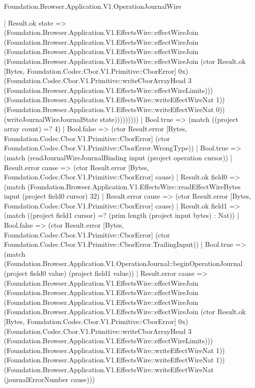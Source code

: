 \begin{lexlean}{Foundation.Browser.Application.V1.OperationJournalWire}
\begin{semanticmodule}
{                          | Result.ok state => (Foundation.Browser.Application.V1.EffectsWire::effectWireJoin (Foundation.Browser.Application.V1.EffectsWire::effectWireJoin (Foundation.Browser.Application.V1.EffectsWire::effectWireJoin (Foundation.Browser.Application.V1.EffectsWire::effectWireJoin (ctor Result.ok [Bytes, Foundation.Codec.Cbor.V1.Primitive::CborError] 0x) (Foundation.Codec.Cbor.V1.Primitive::writeCborArrayHead 3 (Foundation.Browser.Application.V1.EffectsWire::effectWireLimits))) (Foundation.Browser.Application.V1.EffectsWire::writeEffectWireNat 1)) (Foundation.Browser.Application.V1.EffectsWire::writeEffectWireNat 0)) (writeJournalWireJournalState state)))))))))
            | Bool.true => (match ((project array count) =? 4)
              | Bool.false => (ctor Result.error [Bytes, Foundation.Codec.Cbor.V1.Primitive::CborError] (ctor Foundation.Codec.Cbor.V1.Primitive::CborError.WrongType))
              | Bool.true => (match (readJournalWireJournalBinding input (project operation cursor))
                | Result.error cause => (ctor Result.error [Bytes, Foundation.Codec.Cbor.V1.Primitive::CborError] cause)
                | Result.ok field0 => (match (Foundation.Browser.Application.V1.EffectsWire::readEffectWireBytes input (project field0 cursor) 32)
                  | Result.error cause => (ctor Result.error [Bytes, Foundation.Codec.Cbor.V1.Primitive::CborError] cause)
                  | Result.ok field1 => (match ((project field1 cursor) =? (prim length (project input bytes) : Nat))
                    | Bool.false => (ctor Result.error [Bytes, Foundation.Codec.Cbor.V1.Primitive::CborError] (ctor Foundation.Codec.Cbor.V1.Primitive::CborError.TrailingInput))
                    | Bool.true => (match (Foundation.Browser.Application.V1.OperationJournal::beginOperationJournal (project field0 value) (project field1 value))
                      | Result.error cause => (Foundation.Browser.Application.V1.EffectsWire::effectWireJoin (Foundation.Browser.Application.V1.EffectsWire::effectWireJoin (Foundation.Browser.Application.V1.EffectsWire::effectWireJoin (Foundation.Browser.Application.V1.EffectsWire::effectWireJoin (ctor Result.ok [Bytes, Foundation.Codec.Cbor.V1.Primitive::CborError] 0x) (Foundation.Codec.Cbor.V1.Primitive::writeCborArrayHead 3 (Foundation.Browser.Application.V1.EffectsWire::effectWireLimits))) (Foundation.Browser.Application.V1.EffectsWire::writeEffectWireNat 1)) (Foundation.Browser.Application.V1.EffectsWire::writeEffectWireNat 1)) (Foundation.Browser.Application.V1.EffectsWire::writeEffectWireNat (journalErrorNumber cause)))
}
\end{semanticmodule}
\end{lexlean}
